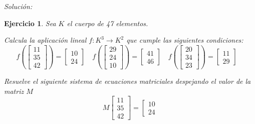 \documentclass[12pt]{amsart}
\newtheorem{ejer}{Ejercicio}
\begin{document}
{\it Soluci\'on:}



\begin{ejer} Sea $K$ el cuerpo de 47 elementos.
\newline
\noindent\begin{minipage}{\textwidth}
\begin{tcolorbox}[colback = green!20!white,title=Versión Aplicación]
Calcula la aplicaci\'on lineal $f:K^{3} \to K^{2}$ que cumple las siguientes condiciones: 
\[f\left(\left[\begin{array}{r}
11 \\
35 \\
42
\end{array}\right]\right) = \left[\begin{array}{r}
10 \\
24
\end{array}\right] \quad f\left(\left[\begin{array}{r}
29 \\
24 \\
10
\end{array}\right]\right) = \left[\begin{array}{r}
41 \\
46
\end{array}\right] \quad f\left(\left[\begin{array}{r}
20 \\
34 \\
23
\end{array}\right]\right) = \left[\begin{array}{r}
11 \\
29
\end{array}\right] \quad 
\]\end{tcolorbox}
\end{minipage} \newline
\noindent\begin{minipage}{\textwidth}
\begin{tcolorbox}[colback = blue!20!white,title=Versión Sistema Matricial]
Resuelve el siguiente sistema de ecuaciones matriciales despejando el valor de la matriz $M$
\[M \left[\begin{array}{r}
11 \\
35 \\
42
\end{array}\right] = \left[\begin{array}{r}
10 \\
24

\end{array}\]
\end{tcolorbox}
\end{minipage}
\end{ejer}
\end{document}
